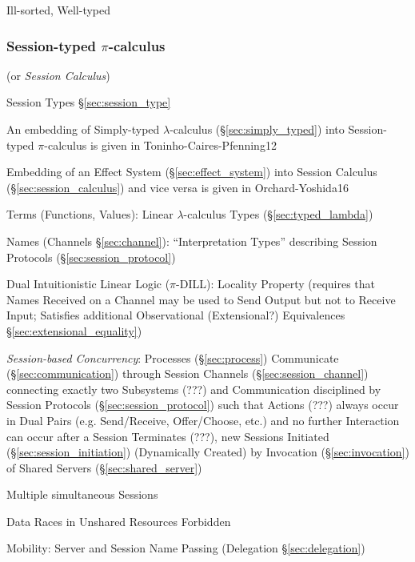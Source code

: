 Ill-sorted, Well-typed %



\subsubsection{Session-typed $\pi$-calculus}
\label{sec:sessiontyped_pi}
\cite{honda-vasconcelos-kubo98}
\cite{caires-pfenning10}
\cite{caires-pfenning-toninho12}

(or \emph{Session Calculus})

Session Types \S\ref{sec:session_type}

\fist An embedding of Simply-typed $\lambda$-calculus
(\S\ref{sec:simply_typed}) into Session-typed $\pi$-calculus is given
in Toninho-Caires-Pfenning12 \cite{caires-pfenning-toninho12}

\fist Embedding of an Effect System (\S\ref{sec:effect_system}) into
Session Calculus (\S\ref{sec:session_calculus}) and vice versa is
given in Orchard-Yoshida16 \cite{orchard-yoshida16}

Terms (Functions, Values): Linear $\lambda$-calculus Types
(\S\ref{sec:typed_lambda})

Names (Channels \S\ref{sec:channel}): ``Interpretation Types''
describing Session Protocols (\S\ref{sec:session_protocol})

Dual Intuitionistic Linear Logic ($\pi$-DILL):
\cite{caires-pfenning10} Locality Property (requires that Names
Received on a Channel may be used to Send Output but not to Receive
Input; Satisfies additional Observational (Extensional?) Equivalences
\S\ref{sec:extensional_equality}) \cite{wadler12}

\emph{Session-based Concurrency}: Processes (\S\ref{sec:process})
Communicate (\S\ref{sec:communication}) through Session Channels
(\S\ref{sec:session_channel}) connecting exactly two Subsystems (???)
and Communication disciplined by Session Protocols
(\S\ref{sec:session_protocol}) such that Actions (???) always occur in
Dual Pairs (e.g. Send/Receive, Offer/Choose, etc.) and no further
Interaction can occur after a Session Terminates (???), new Sessions
Initiated (\S\ref{sec:session_initiation}) (Dynamically Created) by
Invocation (\S\ref{sec:invocation}) of Shared Servers
(\S\ref{sec:shared_server}) \cite{caires-pfenning10}

Multiple simultaneous Sessions

Data Races in Unshared Resources Forbidden

Mobility: Server and Session Name Passing (Delegation
\S\ref{sec:delegation})

